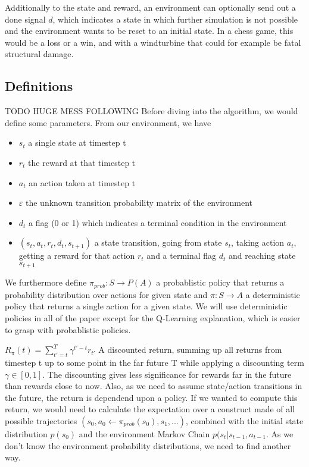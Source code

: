 \documentclass[hyperref,german,beleg]{cgvpub}
\begin{document}
Additionally to the state and reward, an environment can optionally send out a done signal \(d\), which indicates a state in which further simulation is not possible and the environment wants to be reset to an initial state. In a chess game, this would be a loss or a win, and with a windturbine that could for example be fatal structural damage.

\subsection{Definitions}

TODO HUGE MESS FOLLOWING
Before diving into the algorithm, we would define some parameters. From our environment, we have
\begin{itemize}
  \item \(s_t\) a single state at timestep t
  \item \(r_t\) the reward at that timestep t
  \item \(a_t\) an action taken at timestep t
  \item \(\varepsilon\) the unknown transition probability matrix of the environment
  \item \(d_t\) a flag (0 or 1) which indicates a terminal condition in the environment
  \item \((s_t, a_t, r_t, d_t, s_{t+1})\) a state transition, going from state \(s_t\), taking action \(a_t\), getting a reward for that action \(r_t\) and a terminal flag \(d_t\) and reaching state \(s_{t+1}\)
\end{itemize}

We furthermore define \(\pi_{prob}: S \rightarrow P(A)\) a probablistic policy that returns a probability distribution over actions for given state and \(\pi: S \rightarrow A\) a deterministic policy that returns a single action for a given state. We will use deterministic policies in all of the paper except for the Q-Learning explanation, which is easier to grasp with probablistic policies.


  \(R_{\pi}(t) = \sum^T_{t'=t}{\gamma^{t'-t}r_{t'}}\) A discounted return, summing up all returns from timestep t up to some point in the far future T while applying a discounting term \(\gamma \in [0, 1]\). The discounting gives less significance for rewards far in the future than rewards close to now. Also, as we need to assume state/action transitions in the future, the return is dependend upon a policy. If we wanted to compute this return, we would need to calculate the expectation over a construct made of all possible trajectories \( (s_0, a_0 \leftarrow \pi_{prob}(s_0), s_1, ...) \), combined with the initial state distribution \(p(s_0)\) and the environment Markov Chain \(p(s_{t}|s_{t-1}, a_{t-1}\). As we don't know the environment probability distributions, we need to find another way.
\end{document}

